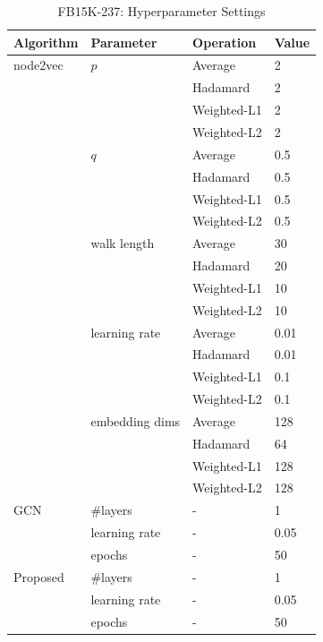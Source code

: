 \documentclass[sigconf]{acmart}
\begin{document}
\begin{table}[!ht]
    \centering
    \caption{FB15K-237: Hyperparameter Settings}
    \label{tab:lp-hyper}
    \begin{tabular}{llll}
        \toprule
        \textbf{Algorithm} & \textbf{Parameter} & \textbf{Operation}& \textbf{Value}\\
        \midrule
        node2vec & $p$ & Average & 2\\
                 & & Hadamard & 2\\
                 & & Weighted-L1 & 2\\
                 & & Weighted-L2 & 2\\
                 & $q$ & Average & 0.5\\
                 & & Hadamard & 0.5\\
                 & & Weighted-L1 & 0.5\\
                 & & Weighted-L2 & 0.5\\
                 & walk length & Average & 30\\
                 & & Hadamard & 20\\
                 & & Weighted-L1 & 10\\
                 & & Weighted-L2 & 10\\
                 & learning rate & Average & 0.01\\
                 & & Hadamard & 0.01\\
                 & & Weighted-L1 & 0.1\\
                 & & Weighted-L2 & 0.1\\
                 & embedding dims & Average & 128\\
                 & & Hadamard & 64\\
                 & & Weighted-L1 & 128\\
                 & & Weighted-L2 & 128\\
        GCN & \#layers & - & 1\\
            & learning rate & - & 0.05\\
            & epochs & - & 50\\
        Proposed & \#layers & - & 1\\
                 & learning rate & - & 0.05\\
                 & epochs & - & 50\\
       \bottomrule
    \end{tabular}
\end{table}
\end{document}
